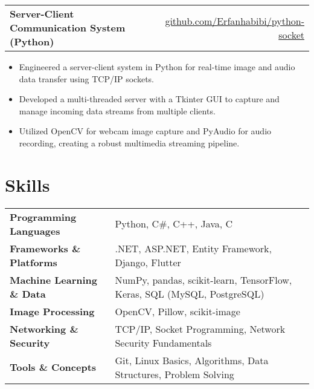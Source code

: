 \documentclass[10pt,a4paper]{article}
\begin{document}
\vspace{0.1cm}

\begin{tabularx}{\textwidth}{X@{\hskip 1em}r}
    \textbf{Server-Client Communication System (Python)} & \href{https://github.com/Erfanhabibi/python-socket}{github.com/Erfanhabibi/python-socket} \\
\end{tabularx}
\begin{itemize}
    \item Engineered a server-client system in Python for real-time image and audio data transfer using TCP/IP sockets.
    \item Developed a multi-threaded server with a Tkinter GUI to capture and manage incoming data streams from multiple clients.
    \item Utilized OpenCV for webcam image capture and PyAudio for audio recording, creating a robust multimedia streaming pipeline.
\end{itemize}


\section{Skills}
\begin{tabularx}{\textwidth}{@{}lX@{}}
    \textbf{Programming Languages} & Python, C\#, C++, Java, C \\
    \textbf{Frameworks \& Platforms} & .NET, ASP.NET, Entity Framework, Django, Flutter \\
    \textbf{Machine Learning \& Data} & NumPy, pandas, scikit-learn, TensorFlow, Keras, SQL (MySQL, PostgreSQL) \\
    \textbf{Image Processing} & OpenCV, Pillow, scikit-image \\
    \textbf{Networking \& Security} & TCP/IP, Socket Programming, Network Security Fundamentals  \\
    \textbf{Tools \& Concepts} & Git, Linux Basics, Algorithms, Data Structures, Problem Solving \\
\end{tabularx}
\end{document}
